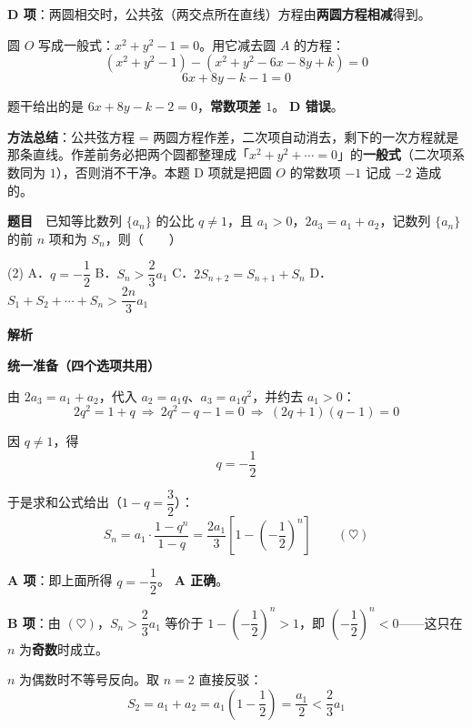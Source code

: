 \textbf{D 项}：两圆相交时，公共弦（两交点所在直线）方程由\textbf{两圆方程相减}得到。

圆 $O$ 写成一般式：$x^2+y^2-1=0$。用它减去圆 $A$ 的方程：
\[\left(x^2+y^2-1\right)-\left(x^2+y^2-6x-8y+k\right)=0\]
\[6x+8y-k-1=0\]

题干给出的是 $6x+8y-k-2=0$，\textbf{常数项差 $1$}。 \textbf{D 错误}。


\begin{gktip}
\textbf{方法总结}：公共弦方程 = 两圆方程作差，二次项自动消去，剩下的一次方程就是那条直线。作差前务必把两个圆都整理成「$x^2+y^2+\cdots=0$」的\textbf{一般式}（二次项系数同为 $1$），否则消不干净。本题 D 项就是把圆 $O$ 的常数项 $-1$ 记成 $-2$ 造成的。
\end{gktip}

\par\medskip


\textbf{题目}　已知等比数列 $\{a_n\}$ 的公比 $q\ne1$，且 $a_1>0$，$2a_3=a_1+a_2$，记数列 $\{a_n\}$ 的前 $n$ 项和为 $S_n$，则（　　）

\begin{gkopts}(2)
\task A．$q=-\dfrac{1}{2}$
\task B．$S_n>\dfrac{2}{3}a_1$
\task C．$2S_{n+2}=S_{n+1}+S_n$
\task D．$S_1+S_2+\cdots+S_n>\dfrac{2n}{3}a_1$
\end{gkopts}

\textbf{解析}

\textbf{统一准备（四个选项共用）}

由 $2a_3=a_1+a_2$，代入 $a_2=a_1q$、$a_3=a_1q^2$，并约去 $a_1>0$：
\[2q^2=1+q\ \Longrightarrow\ 2q^2-q-1=0\ \Longrightarrow\ (2q+1)(q-1)=0\]

因 $q\ne1$，得
\[q=-\frac12\]

于是求和公式给出（$1-q=\dfrac32$）：
\[S_n=a_1\cdot\frac{1-q^n}{1-q}=\frac{2a_1}{3}\left[1-\left(-\frac12\right)^n\right]\qquad(\heartsuit)\]

\par\medskip

\textbf{A 项}：即上面所得 $q=-\dfrac12$。 \textbf{A 正确}。

\par\medskip

\textbf{B 项}：由 $(\heartsuit)$，$S_n>\dfrac23a_1$ 等价于 $1-\left(-\dfrac12\right)^n>1$，即 $\left(-\dfrac12\right)^n<0$——这只在 $n$ 为\textbf{奇数}时成立。

$n$ 为偶数时不等号反向。取 $n=2$ 直接反驳：
\[S_2=a_1+a_2=a_1\left(1-\frac12\right)=\frac{a_1}{2}<\frac23a_1\]

